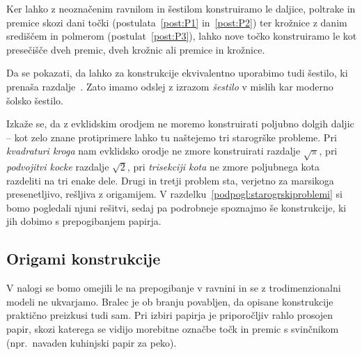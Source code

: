 \begin{opomba}
    Ker lahko z neoznačenim ravnilom in šestilom konstruiramo le daljice, poltrake in premice skozi dani točki (postulata~\ref{post:P1} in~\ref{post:P2}) ter krožnice z danim središčem in polmerom (postulat~\ref{post:P3}), lahko nove točko konstruiramo le kot presečišče dveh premic, dveh krožnic ali premice in krožnice.
\end{opomba}

\begin{opomba}
    \label{opom:solsko_sestilo}
    Da se pokazati, da lahko za konstrukcije ekvivalentno uporabimo tudi šestilo, ki prenaša razdalje~\cite[str.\ 6--7]{geometricconstructions}. Zato imamo odslej z izrazom \emph{šestilo} v mislih kar moderno šolsko šestilo.
\end{opomba}

Izkaže se, da z evklidskim orodjem ne moremo konstruirati poljubno dolgih daljic -- kot zelo znane protiprimere lahko tu naštejemo tri starogrške probleme. Pri \emph{kvadraturi kroga} nam evklidsko orodje ne zmore konstruirati razdalje $\sqrt{\pi}$, pri \emph{podvojitvi kocke} razdalje $\sqrt{2}$, pri \emph{trisekciji kota} ne zmore poljubnega kota razdeliti na tri enake dele. Drugi in tretji problem sta, verjetno za marsikoga presenetljivo, rešljiva z origamijem. V razdelku~\ref{podpogl:starogrskiproblemi} si bomo pogledali njuni rešitvi, sedaj pa podrobneje spoznajmo še konstrukcije, ki jih dobimo s prepogibanjem papirja.

\subsection{Origami konstrukcije}
\label{origami_konstrukcije}

V nalogi se bomo omejili le na prepogibanje v ravnini in se z trodimenzionalni modeli ne ukvarjamo. Bralec je ob branju povabljen, da opisane konstrukcije praktično preizkusi tudi sam. Pri izbiri papirja je priporočljiv rahlo prosojen papir, skozi katerega se vidijo morebitne označbe točk in premic s svinčnikom (npr.\ navaden kuhinjski papir za peko).

